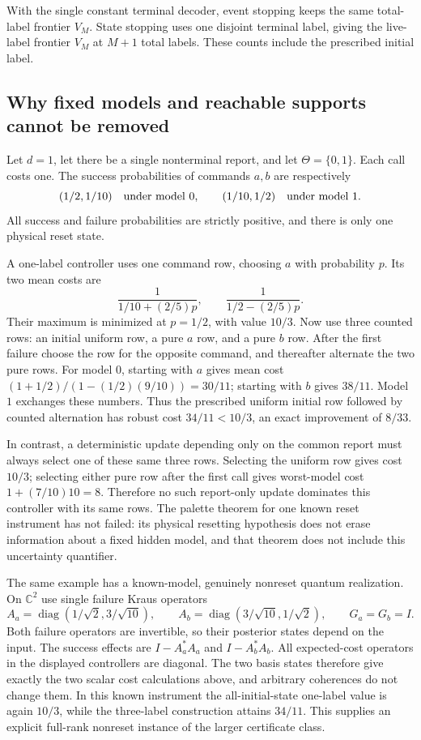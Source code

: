 With the single constant terminal decoder, event stopping keeps the
same total-label frontier $V_M$.  State stopping uses one disjoint
terminal label, giving the live-label frontier $V_M$ at $M+1$ total
labels.  These counts include the prescribed initial label.

\subsection{Why fixed models and reachable supports cannot be removed}

\begin{example}
\label{ex:r79-hidden-model-memory}
Let $d=1$, let there be a single nonterminal report, and let
$\Theta=\{0,1\}$.  Each call costs one.  The success probabilities
of commands $a,b$ are respectively
\[
 (1/2,1/10)\quad\hbox{under model }0,
 \qquad (1/10,1/2)\quad\hbox{under model }1.
\]
All success and failure probabilities are strictly positive, and
there is only one physical reset state.

A one-label controller uses one command row, choosing $a$ with
probability $p$.  Its two mean costs are
\[
 \frac1{1/10+(2/5)p},\qquad
 \frac1{1/2-(2/5)p}.
\]
Their maximum is minimized at $p=1/2$, with value $10/3$.
Now use three counted rows: an initial uniform row, a pure $a$ row,
and a pure $b$ row.  After the first failure choose the row for the
opposite command, and thereafter alternate the two pure rows.
For model $0$, starting with $a$ gives mean cost
$ (1+1/2)/(1-(1/2)(9/10))=30/11$; starting with $b$ gives
$38/11$.  Model $1$ exchanges these numbers.  Thus the prescribed
uniform initial row followed by counted alternation has robust cost
$34/11<10/3$, an exact improvement of $8/33$.

In contrast, a deterministic update depending only on the common
report must always select one of these same three rows.  Selecting
the uniform row gives cost $10/3$; selecting either pure row after
the first call gives worst-model cost $1+(7/10)10=8$.  Therefore
no such report-only update dominates this controller with its same
rows.  The palette theorem for one known reset instrument has not
failed: its physical resetting hypothesis does not erase information
about a fixed hidden model, and that theorem does not include this
uncertainty quantifier.
\end{example}

The same example has a known-model, genuinely nonreset quantum
realization.  On $\mathbb C^2$ use single failure Kraus operators
\[
 A_a=\operatorname{diag}(1/\sqrt2,3/\sqrt{10}),\qquad
 A_b=\operatorname{diag}(3/\sqrt{10},1/\sqrt2),
 \qquad G_a=G_b=I.
\]
Both failure operators are invertible, so their posterior states
depend on the input.  The success effects are
$I-A_a^*A_a$ and $I-A_b^*A_b$.  All expected-cost operators in the
displayed controllers are diagonal.  The two basis states therefore
give exactly the two scalar cost calculations above, and arbitrary
coherences do not change them.  In this known instrument the
all-initial-state one-label value is again $10/3$, while the
three-label construction attains $34/11$.  This supplies an explicit
full-rank nonreset instance of the larger certificate class.

